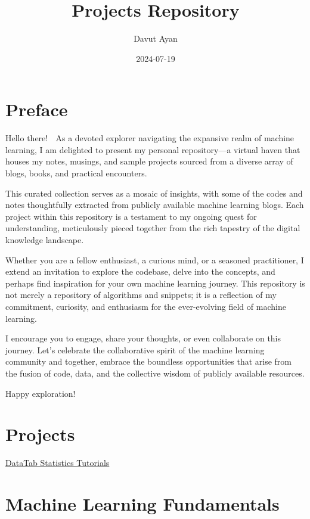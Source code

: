 \documentclass[
]{book}
\title{Projects Repository}
\author{Davut Ayan}
\date{2024-07-19}
\begin{document}
\maketitle

{
\setcounter{tocdepth}{1}
\tableofcontents
}
\hypertarget{preface}{%
\chapter*{Preface}\label{preface}}

Hello there! 👋 As a devoted explorer navigating the expansive realm of machine learning, I am delighted to present my personal repository---a virtual haven that houses my notes, musings, and sample projects sourced from a diverse array of blogs, books, and practical encounters.

This curated collection serves as a mosaic of insights, with some of the codes and notes thoughtfully extracted from publicly available machine learning blogs. Each project within this repository is a testament to my ongoing quest for understanding, meticulously pieced together from the rich tapestry of the digital knowledge landscape.

Whether you are a fellow enthusiast, a curious mind, or a seasoned practitioner, I extend an invitation to explore the codebase, delve into the concepts, and perhaps find inspiration for your own machine learning journey. This repository is not merely a repository of algorithms and snippets; it is a reflection of my commitment, curiosity, and enthusiasm for the ever-evolving field of machine learning.

I encourage you to engage, share your thoughts, or even collaborate on this journey. Let's celebrate the collaborative spirit of the machine learning community and together, embrace the boundless opportunities that arise from the fusion of code, data, and the collective wisdom of publicly available resources.

Happy exploration!

\hypertarget{projects}{%
\chapter{Projects}\label{projects}}

\href{https://datatab.net/tutorial/get-started}{DataTab Statistics Tutorials}

\hypertarget{machine-learning-fundamentals}{%
\chapter{Machine Learning Fundamentals}\label{machine-learning-fundamentals}}
\end{document}
